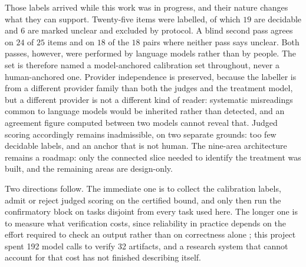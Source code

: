 \documentclass[11pt,a4paper]{article}
\begin{document}
Those labels arrived while this work was in progress, and their nature changes what they
can support. Twenty-five items were labelled, of which $19$ are decidable and $6$ are
marked unclear and excluded by protocol. A blind second pass agrees on $24$ of $25$ items
and on $18$ of the $18$ pairs where neither pass says unclear. Both passes, however, were
performed by language models rather than by people. The set is therefore named a
model-anchored calibration set throughout, never a human-anchored one. Provider
independence is preserved, because the labeller is from a different provider family than
both the judges and the treatment model, but a different provider is not a different kind
of reader: systematic misreadings common to language models would be inherited rather than
detected, and an agreement figure computed between two models cannot reveal that. Judged
scoring accordingly remains inadmissible, on two separate grounds: too few decidable labels,
and an anchor that is not human.  The nine-area architecture
remains a roadmap: only the connected slice needed to identify the treatment was
built, and the remaining areas are design-only.

Two directions follow.  The immediate one is to collect the calibration labels,
admit or reject judged scoring on the certified bound, and only then run the
confirmatory block on tasks disjoint from every task used here.  The longer one
is to measure what verification costs, since reliability in practice depends on
the effort required to check an output rather than on correctness alone
\citep{verificationcost2026}; this project spent 192 model calls to verify 32
artifacts, and a research system that cannot account for that cost has not
finished describing itself.
\end{document}
